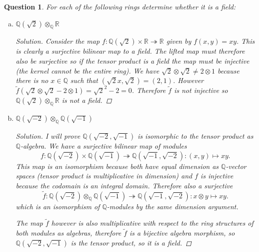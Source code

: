 \documentclass{article}
\newcommand{\Q}{\mathbb{Q}}
\newcommand{\R}{\mathbb{R}}
\newenvironment{solution}{\begin{proof}[Solution]\renewcommand\qedsymbol{}}{\end{proof}}
\newtheorem{question}{Question}
\theoremstyle{definition}
\begin{document}
\begin{question}
    For each of the following rings determine whether it is a field:
    \begin{enumerate}[(a)]
        \item \(\Q(\sqrt{2})\otimes_{\Q}\R\)

              \begin{solution}
                  Consider the map \(f:\Q(\sqrt{2})\times\R\twoheadrightarrow\R\)
                  given by \(f(x,y)=xy\). This is clearly a surjective bilinear
                  map to a field. The lifted map must therefore also be
                  surjective so if the tensor product is a field the map must be
                  injective (the kernel cannot be the entire ring). We have
                  \(\sqrt{2}\otimes\sqrt{2}\neq 2\otimes 1\) because there is no
                  \(x\in\Q\) such that \((\sqrt{2}x,\sqrt2)=(2,1)\). However
                  \(\tilde{f}(\sqrt{2}\otimes\sqrt{2}-2\otimes
                  1)=\sqrt{2}^{2}-2=0\). Therefore \(\tilde{f}\) is not
                  injective so \(\Q(\sqrt{2})\otimes_{\Q}\R\) is not a field.
              \end{solution}

        \item \(\Q(\sqrt{-2})\otimes_{\Q}\Q(\sqrt{-1})\)

              \begin{solution}
                  I will prove \(\Q(\sqrt{-2},\sqrt{-1})\) is isomorphic to the
                  tensor product as \(\Q\)-algebra. We have a surjective
                  bilinear map of modules
                  \[
                      f:\Q(\sqrt{-2})\times\Q(\sqrt{-1})\twoheadrightarrow\Q(\sqrt{-1},\sqrt{-2}):(x,y)\mapsto xy.
                  \]
                  This map is an isomorphism because both have equal dimension
                  as \(\Q\)-vector spaces (tensor product is multiplicative in
                  dimension) and \(f\) is injective because the codomain is an
                  integral domain. Therefore also a surjective
                  \[
                      \tilde{f}:\Q(\sqrt{-2})\otimes_{\Q}\Q(\sqrt{-1})\twoheadrightarrow\Q(\sqrt{-1},\sqrt{-2}):x\otimes y\mapsto xy.
                  \]
                  which is an isomorphism of \(\Q\)-modules by the same
                  dimension argument.

                  The map \(\tilde{f}\) however is also multiplicative with
                  respect to the ring structures of both modules as algebras,
                  therefore \(\tilde{f}\) is a bijective algebra morphism, so
                  \(\Q(\sqrt{-2},\sqrt{-1})\) is the tensor product, so it is a
                  field.
              \end{solution}
    \end{enumerate}
\end{question}
\end{document}
